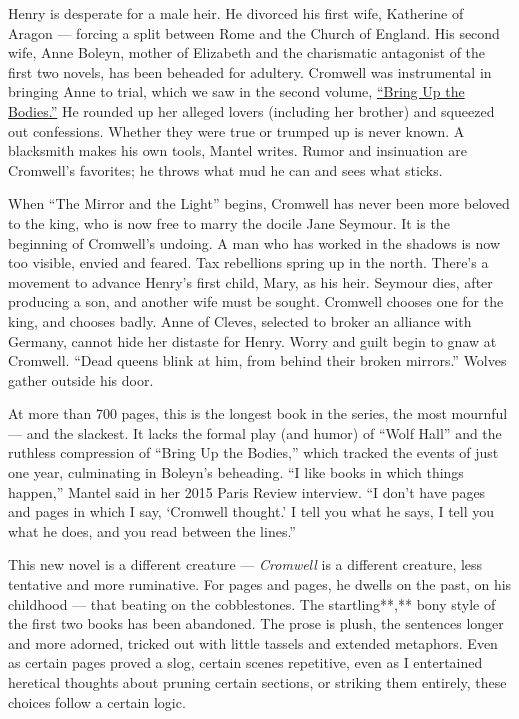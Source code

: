 Henry is desperate for a male heir. He divorced his first wife,
Katherine of Aragon --- forcing a split between Rome and the Church of
England. His second wife, Anne Boleyn, mother of Elizabeth and the
charismatic antagonist of the first two novels, has been beheaded for
adultery. Cromwell was instrumental in bringing Anne to trial, which we
saw in the second volume,
\href{https://www.nytimes.com/2012/05/27/books/review/bring-up-the-bodies-by-hilary-mantel.html}{``Bring
Up the Bodies.''} He rounded up her alleged lovers (including her
brother) and squeezed out confessions. Whether they were true or trumped
up is never known. A blacksmith makes his own tools, Mantel writes.
Rumor and insinuation are Cromwell's favorites; he throws what mud he
can and sees what sticks.

When ``The Mirror and the Light'' begins, Cromwell has never been more
beloved to the king, who is now free to marry the docile Jane Seymour.
It is the beginning of Cromwell's undoing. A man who has worked in the
shadows is now too visible, envied and feared. Tax rebellions spring up
in the north. There's a movement to advance Henry's first child, Mary,
as his heir. Seymour dies, after producing a son, and another wife must
be sought. Cromwell chooses one for the king, and chooses badly. Anne of
Cleves, selected to broker an alliance with Germany, cannot hide her
distaste for Henry. Worry and guilt begin to gnaw at Cromwell. ``Dead
queens blink at him, from behind their broken mirrors.'' Wolves gather
outside his door.

At more than 700 pages, this is the longest book in the series, the most
mournful --- and the slackest. It lacks the formal play (and humor) of
``Wolf Hall'' and the ruthless compression of ``Bring Up the Bodies,''
which tracked the events of just one year, culminating in Boleyn's
beheading. ``I like books in which things happen,'' Mantel said in her
2015 Paris Review interview. ``I don't have pages and pages in which I
say, `Cromwell thought.' I tell you what he says, I tell you what he
does, and you read between the lines.''

This new novel is a different creature --- \emph{Cromwell} is a
different creature, less tentative and more ruminative. For pages and
pages, he dwells on the past, on his childhood --- that beating on the
cobblestones. The startling**,** bony style of the first two books has
been abandoned. The prose is plush, the sentences longer and more
adorned, tricked out with little tassels and extended metaphors. Even as
certain pages proved a slog, certain scenes repetitive, even as I
entertained heretical thoughts about pruning certain sections, or
striking them entirely, these choices follow a certain logic.

